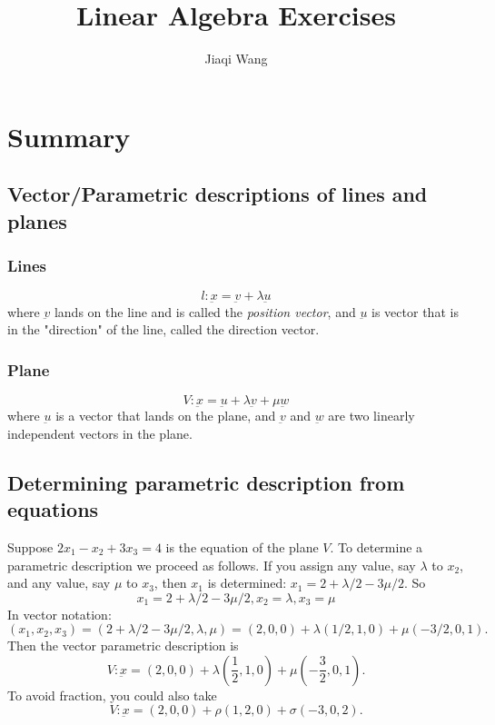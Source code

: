 \documentclass{article}
\title{Linear Algebra Exercises}
\author{Jiaqi Wang}
\theoremstyle{mytheoremstyle}
\theoremstyle{mytheoremstyle}
\theoremstyle{myproblemstyle}
\theoremstyle{myproblemstyle}
\begin{document}
\maketitle

\section{Summary}
\subsection{Vector/Parametric descriptions of lines and planes}
\subsubsection{Lines}
$$ \textit{l}: \underbar{x} = \underbar{v} + \lambda \underbar{u} $$
where $\underbar{v}$ lands on the line and is called the \emph{position vector},
and $\underbar{u}$ is vector that is in the "direction" of the line, called the
direction vector.

\subsubsection{Plane}
$$ V: \underbar{x} = \underbar{u} + \lambda\underbar{v} + \mu\underbar{w} $$
where $\underbar{u}$ is a vector that lands on the plane, and $\underbar{v}$
and $\underbar{w}$ are two linearly independent vectors in the plane.

\subsection{Determining parametric description from equations}
\begin{example}
	Suppose $2x_1-x_2+3x_3 = 4$ is the equation of the plane $V$. To determine a parametric description we proceed as follows.
	If you assign any value, say $\lambda$ to $x_2$, and any value, say $\mu$ to $x_3$, then $x_1$ is determined: $x_1 = 2+\lambda/2 - 3\mu/2$.
	So
	$$x_1 = 2+\lambda/2 - 3\mu/2, x_2 = \lambda, x_3 = \mu$$
	In vector notation:
	$$(x_1,x_2,x_3) = (2+\lambda/2-3\mu/2,\lambda,\mu) = (2,0,0) + \lambda(1/2,1,0) + \mu(-3/2,0,1).$$
	Then the vector parametric description is
	$$V: \underbar{x} = (2,0,0) + \lambda(\frac{1}{2},1,0) + \mu(-\frac{3}{2}, 0, 1).$$
	To avoid fraction, you could also take
	$$V: \underbar{x} = (2,0,0) + \rho(1,2,0) + \sigma(-3,0,2).$$
\end{example}
\end{document}
